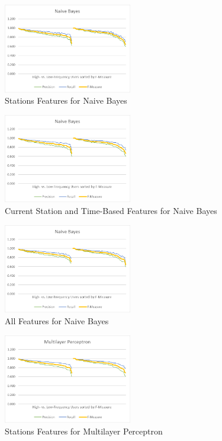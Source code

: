 \begin{figure}[H]
	\centering
	\includegraphics[width=0.5\textwidth]{files/high_vs_low_frequency/naive_bayes_stas}
	\caption{Stations Features for Naive Bayes}
\end{figure}

\begin{figure}[H]
	\centering
	\includegraphics[width=0.5\textwidth]{files/high_vs_low_frequency/naive_bayes_csta_ts}
	\caption{Current Station and Time-Based Features for Naive Bayes}
\end{figure}

\begin{figure}[H]
	\centering
	\includegraphics[width=0.5\textwidth]{files/high_vs_low_frequency/naive_bayes_all}
	\caption{All Features for Naive Bayes}
\end{figure}


\begin{figure}[H]
	\centering
	\includegraphics[width=0.5\textwidth]{files/high_vs_low_frequency/mp_stas}
	\caption{Stations Features for Multilayer Perceptron}
\end{figure}


